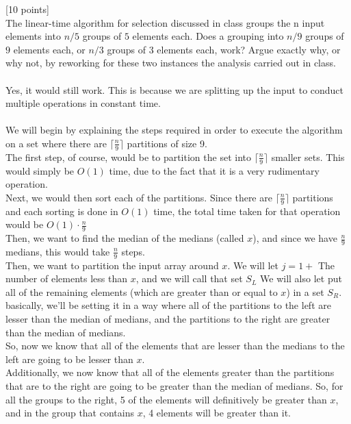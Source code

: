 \documentclass[12pt]{article}
\newcounter{ques}
\newenvironment{question}{\stepcounter{ques}{\noindent\bf Question \arabic{ques}:}}{\vspace{5mm}}
\begin{document}
\begin{question}[10 points]\\
The linear-time algorithm for selection discussed in class groups the n input elements into $n/5$ groups of $5$ elements each. Does a grouping into
$n/9$ groups of $9$ elements each, or $n/3$ groups of $3$ elements each, work? Argue exactly why, or why not, by reworking for these two instances the analysis carried
out in class.\\\\

Yes, it would still work. This is because we are splitting up the input to conduct multiple operations in constant time.\\\\

We will begin by explaining the steps required in order to execute the algorithm on a set where there are $\lceil\frac{n}{9}\rceil$ partitions of size 9.\\
The first step, of course, would be to partition the set into $\lceil\frac{n}{9}\rceil$ smaller sets. This would simply be $O(1)$ time, due to the fact that it is a very rudimentary operation.\\
Next, we would then sort each of the partitions. Since there are $\lceil\frac{n}{9}\rceil$ partitions and each sorting is done in $O(1)$ time, the total time taken for that operation would be $O(1)\cdot\frac{n}{9}$\\
Then, we want to find the median of the medians (called $x$), and since we have $\frac{n}{9}$ medians, this would take $\frac{n}{9}$ steps.\\
Then, we want to partition the input array around $x$.
We will let  $j=1+$ The number of elements less than $x$, and we will call that set $S_L$
We will also let put all of the remaining elements (which are greater than or equal to $x$) in a set $S_R$.
basically, we'll be setting it in a way where all of the partitions to the left are lesser than the median of medians, and the partitions to the right are greater than the median of medians.\\
So, now we know that all of the elements that are lesser than the medians to the left are going to be lesser than $x$.\\
Additionally, we now know that all of the elements greater than the partitions that are to the right are going to be greater than the median of medians.
So, for all the groups to the right, 5 of the elements will definitively be greater than $x$, and in the group that contains $x$, 4 elements will be greater than it.\\

\end{question}
\end{document}
